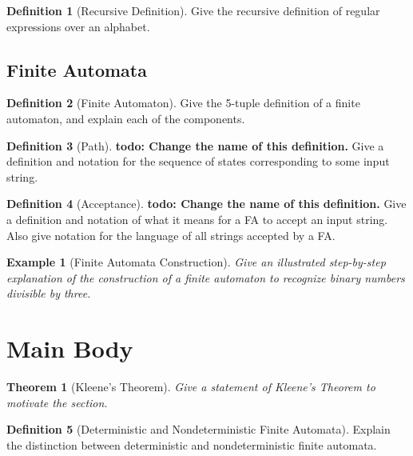 \documentclass[12 pt, twoside, letterpaper]{article}
\newcommand{\todo}[1]{{\textbf{todo: \color{red} {#1}}}}
\theoremstyle{definition}
\newtheorem{definition}{Definition}
\theoremstyle{plain}
\newtheorem*{example}{Example}
\newtheorem{theorem}{Theorem}
\begin{document}
		\begin{definition}[Recursive Definition]
			Give the recursive definition of regular expressions over an alphabet.
		\end{definition}

	\subsection{Finite Automata} %
	\label{sub:finite_automata}
	
		\begin{definition}[Finite Automaton]
			Give the 5-tuple definition of a finite automaton, and explain each of the components.
		\end{definition}

		\begin{definition}[Path]
			\todo{Change the name of this definition.}
			Give a definition and notation for the sequence of states corresponding to some input string.
		\end{definition}

		\begin{definition}[Acceptance]
			\todo{Change the name of this definition.}
			Give a definition and notation of what it means for a FA to accept an input string.
			Also give notation for the language of all strings accepted by a FA.
		\end{definition}

		\begin{example}[Finite Automata Construction]
			Give an illustrated step-by-step explanation of the construction of a finite automaton to recognize binary numbers divisible by three.
		\end{example}



\section{Main Body} %
\label{sec:main_body}

	\begin{theorem}[Kleene's Theorem]
		Give a statement of Kleene's Theorem to motivate the section.
	\end{theorem}

	\begin{definition}[Deterministic and Nondeterministic Finite Automata]
		Explain the distinction between deterministic and nondeterministic finite automata.
	\end{definition}
\end{document}

